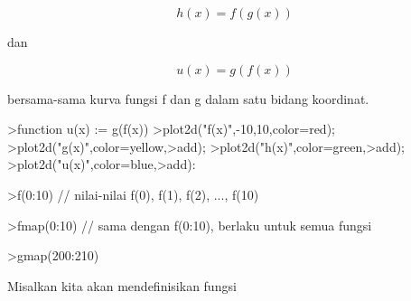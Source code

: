 \documentclass{article}
\begin{document}
\begin{eulernotebook}
\begin{eulercomment}
\end{eulercomment}
\begin{eulerformula}
\[
h(x)=f(g(x))
\]
\end{eulerformula}
\begin{eulercomment}
dan

\end{eulercomment}
\begin{eulerformula}
\[
u(x)=g(f(x))
\]
\end{eulerformula}
\begin{eulercomment}
bersama-sama kurva fungsi f dan g dalam satu bidang koordinat.
\end{eulercomment}
\begin{eulerprompt}
>function u(x) := g(f(x))
>plot2d("f(x)",-10,10,color=red);
>plot2d("g(x)",color=yellow,>add);
>plot2d("h(x)",color=green,>add);
>plot2d("u(x)",color=blue,>add):
\end{eulerprompt}
\begin{eulerprompt}
>f(0:10) // nilai-nilai f(0), f(1), f(2), ..., f(10)
\end{eulerprompt}
\begin{euleroutput}
  [1,  4.31978,  10.4826,  19.1516,  32.4692,  50.3833,  72.7562,
  99.929,  130.69,  163.51,  200.58]
\end{euleroutput}
\begin{eulerprompt}
>fmap(0:10) // sama dengan f(0:10), berlaku untuk semua fungsi
\end{eulerprompt}
\begin{euleroutput}
  [1,  4.31978,  10.4826,  19.1516,  32.4692,  50.3833,  72.7562,
  99.929,  130.69,  163.51,  200.58]
\end{euleroutput}
\begin{eulerprompt}
>gmap(200:210)
\end{eulerprompt}
\begin{euleroutput}
  [0.987534,  0.987596,  0.987657,  0.987718,  0.987778,  0.987837,
  0.987896,  0.987954,  0.988012,  0.988069,  0.988126]
\end{euleroutput}
\begin{eulercomment}
Misalkan kita akan mendefinisikan fungsi


\end{eulercomment}
\end{eulernotebook}
\end{document}
